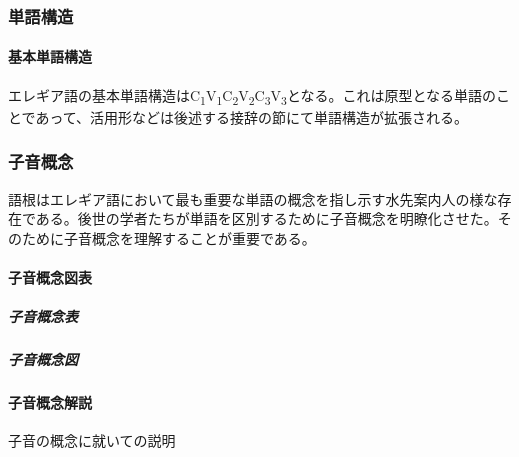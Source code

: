 \documentclass[
  japanese,
]{article}
\begin{document}
\subsubsection{単語構造}\label{section4.1}

\paragraph{基本単語構造}\label{subsection4.1.1}

エレギア語の基本単語構造はC\textsubscript{1}V\textsubscript{1}C\textsubscript{2}V\textsubscript{2}C\textsubscript{3}V\textsubscript{3}となる。これは原型となる単語のことであって、活用形などは後述する接辞の節にて単語構造が拡張される。

\subsubsection{子音概念}\label{section4.2}

語根はエレギア語において最も重要な単語の概念を指し示す水先案内人の様な存在である。後世の学者たちが単語を区別するために子音概念を明瞭化させた。そのために子音概念を理解することが重要である。

\paragraph{子音概念図表}\label{subsection4.2.1}

\subparagraph{子音概念表}\label{subsubsection4.2.1.1}

\subparagraph{子音概念図}\label{subsubsection4.2.1.2}

\paragraph{子音概念解説}\label{subsection4.2.2}

子音の概念に就いての説明
\end{document}
